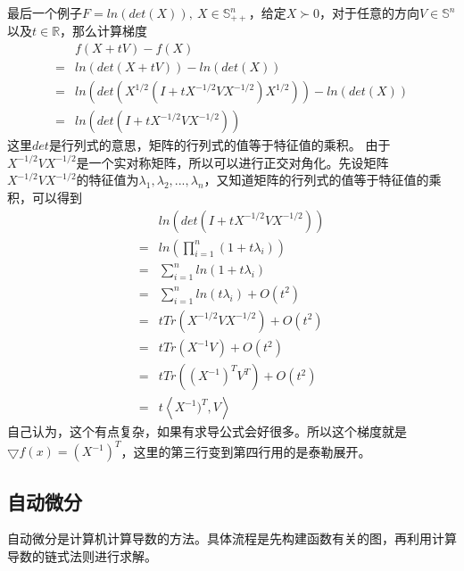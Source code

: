 \documentclass{article}
\begin{document}
最后一个例子$F=ln(det(X)),\ X \in \mathbb{S}^n_{++}$，给定$X \succ 0$，对于任意的方向$V \in \mathbb{S}^n$以及$t \in \mathbb{R}$，那么计算梯度
\begin{equation}
    \begin{split}
    & f(X+tV)-f(X)\\
    =& ln(det(X+tV))-ln(det(X)) \\
    =& ln(det(X^{1/2}(I+tX^{-1/2}VX^{-1/2})X^{1/2}))-ln(det(X)) \\
    =& ln(det(I+tX^{-1/2}VX^{-1/2}))
    \end{split}
\end{equation}
这里$det$是行列式的意思，矩阵的行列式的值等于特征值的乘积。
由于$X^{-1/2}VX^{-1/2}$是一个实对称矩阵，所以可以进行正交对角化。先设矩阵$X^{-1/2}VX^{-1/2}$的特征值为$\lambda_1,\lambda_2,...,\lambda_n$，又知道矩阵的行列式的值等于特征值的乘积，可以得到
\begin{equation}
    \begin{split}
    &ln(det(I+tX^{-1/2}VX^{-1/2}))\\
    =&ln(\prod_{i=1}^n (1+t\lambda_i))\\
    =& \sum\limits_{i=1}^n ln(1+t\lambda_i)\\
    =& \sum\limits_{i=1}^n ln(t\lambda_i)+O(t^2)\\
    =& t Tr(X^{-1/2}VX^{-1/2})+O(t^2)\\
    =& t Tr(X^{-1}V)+O(t^2)\\
    =& t Tr((X^{-1})^TV^T)+O(t^2)\\
    =& t \left\langle X^{-1})^T,V \right\rangle
    \end{split}
\end{equation}
自己认为，这个有点复杂，如果有求导公式会好很多。所以这个梯度就是$\bigtriangledown f(x)=(X^{-1})^T$，这里的第三行变到第四行用的是泰勒展开。
\subsection{自动微分}
自动微分是计算机计算导数的方法。具体流程是先构建函数有关的图，再利用计算导数的链式法则进行求解。
\end{document}
